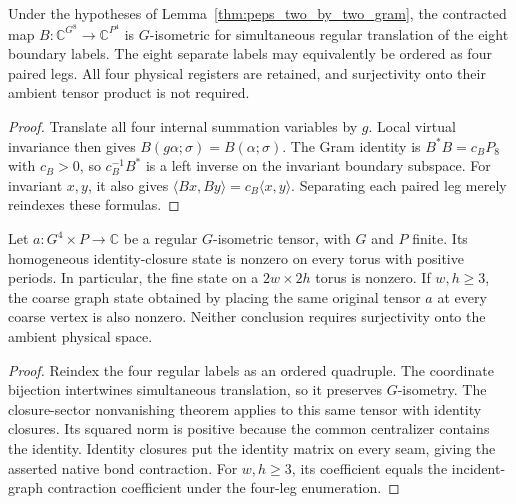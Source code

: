 \begin{lemma}%
    \label{thm:peps_two_by_two_isometry}
    \leanok
    Under the hypotheses of Lemma~\ref{thm:peps_two_by_two_gram},
    the contracted map $B:\mathbb C^{G^8}\to\mathbb C^{P^4}$
    is $G$-isometric for simultaneous regular translation of the eight
    boundary labels. The eight separate labels may equivalently be ordered
    as four paired legs. All four physical registers are retained, and
    surjectivity onto their ambient tensor product is not required.
\end{lemma}

\begin{proof}\leanok
    Translate all four internal summation variables by $g$.
    Local virtual invariance then gives $B(g\alpha;\sigma)=B(\alpha;\sigma)$.
    The Gram identity is $B^*B=c_BP_8$ with $c_B>0$, so
    $c_B^{-1}B^*$ is a left inverse on the invariant boundary subspace.
    For invariant $x,y$, it also gives
    $\langle Bx,By\rangle=c_B\langle x,y\rangle$.
    Separating each paired leg merely reindexes these formulas.
\end{proof}

\begin{lemma}%
    \label{thm:peps_two_by_two_nonzero}
    \leanok
    Let $a:G^4\times P\to\mathbb C$ be a regular $G$-isometric tensor,
    with $G$ and $P$ finite. Its homogeneous identity-closure state is
    nonzero on every torus with positive periods. In particular, the fine
    state on a $2w\times2h$ torus is nonzero. If $w,h\geq3$, the
    coarse graph state obtained by placing the same original tensor $a$
    at every coarse vertex is also nonzero. Neither conclusion requires
    surjectivity onto the ambient physical space.
\end{lemma}

\begin{proof}\leanok
    Reindex the four regular labels as an ordered quadruple. The coordinate
    bijection intertwines simultaneous translation, so it preserves
    $G$-isometry. The closure-sector nonvanishing theorem applies to this
    same tensor with identity closures. Its squared norm is positive because
    the common centralizer contains the identity. Identity closures put
    the identity matrix on every seam, giving the asserted native bond
    contraction. For $w,h\geq3$, its coefficient equals the incident-graph
    contraction coefficient under the four-leg enumeration.
\end{proof}
